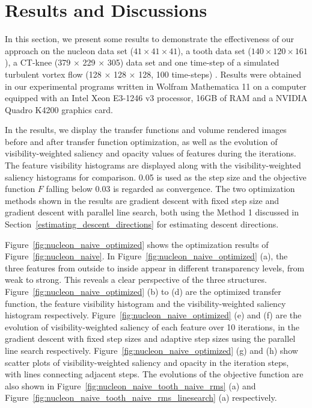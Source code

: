 \section{Results and Discussions}
In this section, we present some results to demonstrate the effectiveness of our approach on the nucleon data set ($ 41 \times 41 \times 41 $), a tooth data set ($ 140 \times 120 \times 161 $), a CT-knee (379 $ \times $ 229 $ \times $ 305) data set \cite{website:Roettger_volume_2013} and one time-step of a simulated turbulent vortex flow (128 $\times$ 128 $\times$ 128, 100 time-steps) \cite{website:Ma_repository_2013}.
Results were obtained in our experimental programs written in Wolfram Mathematica 11 on a computer equipped with an Intel Xeon E3-1246 v3 processor, 16GB of RAM and a NVIDIA Quadro K4200 graphics card.

In the results, we display the transfer functions and volume rendered images before and after transfer function optimization, as well as the evolution of visibility-weighted saliency and opacity values of features during the iterations.
The feature visibility histograms \cite{wang_efficient_2011} are displayed along with the visibility-weighted saliency histograms for comparison.
0.05 is used as the step size and the objective function $ F $ falling below 0.03 is regarded as convergence.
The two optimization methods shown in the results are gradient descent with fixed step size and gradient descent with parallel line search, both using the Method 1 discussed in Section~\ref{estimating_descent_directions} for estimating descent directions.

Figure~\ref{fig:nucleon_naive_optimized} shows the optimization results of Figure~\ref{fig:nucleon_naive}. In Figure~\ref{fig:nucleon_naive_optimized} (a), the three features from outside to inside appear in different transparency levels, from weak to strong. This reveals a clear perspective of the three structures.
Figure~\ref{fig:nucleon_naive_optimized} (b) to (d) are the optimized transfer function, the feature visibility histogram and the visibility-weighted saliency histogram respectively.
Figure~\ref{fig:nucleon_naive_optimized} (e) and (f) are the evolution of visibility-weighted saliency of each feature over 10 iterations, in the gradient descent with fixed step sizes and adaptive step sizes using the parallel line search respectively. Figure~\ref{fig:nucleon_naive_optimized} (g) and (h) show scatter plots of visibility-weighted saliency and opacity in the iteration steps, with lines connecting adjacent steps.
The evolutions of the objective function are also shown in Figure~\ref{fig:nucleon_naive_tooth_naive_rms} (a) and Figure~\ref{fig:nucleon_naive_tooth_naive_rms_linesearch} (a) respectively.

